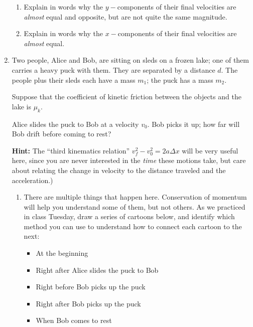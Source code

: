 \documentclass[12pt]{article}
\begin{document}
\begin{enumerate}
\begin{enumerate}
			\item Explain in words why the $y-$components of their final velocities are {\it almost} equal and opposite, but are not quite the same magnitude.
			
			\vspace{2in}
			
			\item Explain in words why the $x-$components of their final velocities are {\it almost} equal. 
		\end{enumerate}

\newpage

\item Two people, Alice and Bob, are sitting on sleds on a frozen lake; one of them carries a heavy puck with them. They are separated by a distance $d$. The people plus their sleds each have a mass $m_1$; the puck has a mass $m_2$.

	Suppose that the coefficient of kinetic friction between the objects and the lake is $\mu_k$.

	Alice slides the puck to Bob at a velocity $v_0$. Bob picks it up; how far will Bob drift before coming to rest?

		{\bf Hint:} The ``third kinematics relation'' $v_f^2 - v_0^2 = 2a\Delta x$ will be very useful here, since you are never interested in the {\it time} these motions take, but care about relating the change in velocity to the distance traveled and the acceleration.)

\begin{enumerate}	
	
	\item There are multiple things that happen here. Conservation of momentum will help you understand some of them, but not others. As we practiced in class Tuesday, draw a series of cartoons below, and identify which method you can use to understand how to connect each cartoon to the next:

		\begin{itemize}
	\item At the beginning
	\item Right after Alice slides the puck to Bob
	\item Right before Bob picks up the puck
	\item Right after Bob picks up the puck
	\item When Bob comes to rest
		\end{itemize}


\newpage

\end{enumerate}
\end{enumerate}
   
\end{document}
